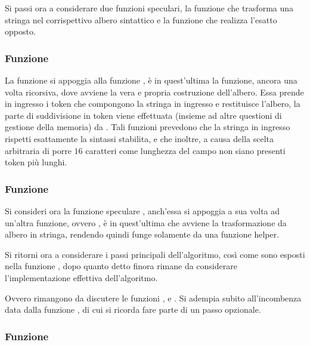 \documentclass[11pt,letterpaper,twoside]{article}
\begin{document}
Si passi ora a considerare due funzioni speculari, la funzione
 che trasforma una stringa nel
corrispettivo albero sintattico e la funzione  che realizza l'esatto opposto.

\subsubsection{Funzione }

La funzione  si appoggia alla funzione , è in
quest'ultima la funzione, ancora una volta ricorsiva, dove avviene la vera e
propria costruzione dell'albero. Essa prende in ingresso i token che compongono
la stringa in ingresso e restituisce l'albero, la parte di suddivisione in token
viene effettuata (insieme ad altre questioni di gestione della memoria) da
. Tali funzioni prevedono che la stringa in ingresso rispetti
esattamente la sintassi stabilita, e che inoltre, a causa della scelta arbitraria
di porre $16$ caratteri come lunghezza del campo  non siano
presenti token più lunghi.

\subsubsection{Funzione }

Si consideri ora la funzione speculare , anch'essa si
appoggia a sua volta ad un'altra funzione, ovvero , è in
quest'ultima che avviene la trasformazione da albero in stringa, rendendo quindi
 funge solamente da una funzione helper.

Si ritorni ora a considerare i passi principali dell'algoritmo, così come sono
esposti nella funzione , dopo quanto detto finora rimane da
considerare l'implementazione effettiva dell'algoritmo.


Ovvero rimangono da discutere le funzioni ,  e
. Si adempia subito all'incombenza data dalla funzione
, di cui si ricorda fare parte di un passo opzionale.

\subsubsection{Funzione }
\end{document}
